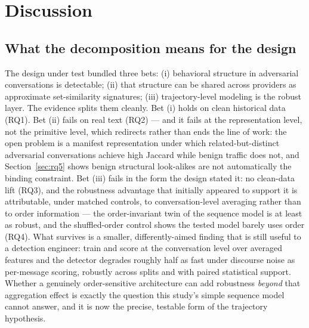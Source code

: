 \documentclass[11pt]{article}
\begin{document}
\section{Discussion}
\label{sec:discussion}

\subsection{What the decomposition means for the design}
The design under test bundled three bets: (i) behavioral structure in adversarial conversations is detectable; (ii) that structure can be shared across providers as approximate set-similarity signatures; (iii) trajectory-level modeling is the robust layer. The evidence splits them cleanly. Bet (i) holds on clean historical data (RQ1). Bet (ii) fails on real text (RQ2) --- and it fails at the representation level, not the primitive level, which redirects rather than ends the line of work: the open problem is a manifest representation under which related-but-distinct adversarial conversations achieve high Jaccard while benign traffic does not, and Section~\ref{sec:rq5} shows benign structural look-alikes are not automatically the binding constraint. Bet (iii) fails in the form the design stated it: no clean-data lift (RQ3), and the robustness advantage that initially appeared to support it is attributable, under matched controls, to conversation-level averaging rather than to order information --- the order-invariant twin of the sequence model is at least as robust, and the shuffled-order control shows the tested model barely uses order (RQ4). What survives is a smaller, differently-aimed finding that is still useful to a detection engineer: train and score at the conversation level over averaged features and the detector degrades roughly half as fast under discourse noise as per-message scoring, robustly across splits and with paired statistical support. Whether a genuinely order-sensitive architecture can add robustness \emph{beyond} that aggregation effect is exactly the question this study's simple sequence model cannot answer, and it is now the precise, testable form of the trajectory hypothesis.
\end{document}
